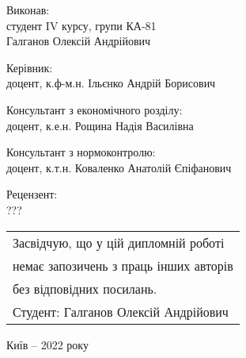 \begin{flushleft}
    {
        Виконав:\\
        студент IV курсу, групи КА-81\\
        Галганов Олексій Андрійович
    
    }

    \vspace{5mm}
    {
        Керівник:\\
        доцент, к.ф-м.н. Ільєнко Андрій Борисович
    
    }

    \vspace{5mm}
    {
        Консультант з економічного розділу:\\
        доцент, к.е.н. Рощина Надія Василівна

        
    }

    \vspace{5mm}
    {        
        Консультант з нормоконтролю:\\
        доцент, к.т.н. Коваленко Анатолій Єпіфанович
        
    }

    \vspace{5mm}
    {
        Рецензент: \\
        ???
        
    }

\end{flushleft}

\begin{flushright}
    \begin{tabular}{l@{}}
        Засвідчую, що у цій дипломній роботі\\
        немає запозичень з праць інших авторів\\
        без відповідних посилань.\\
        Студент: Галганов Олексій Андрійович
  \end{tabular}
\end{flushright}

\begin{center}
    \vspace{10mm}
    Київ -- 2022 року
\end{center}
\newpage
